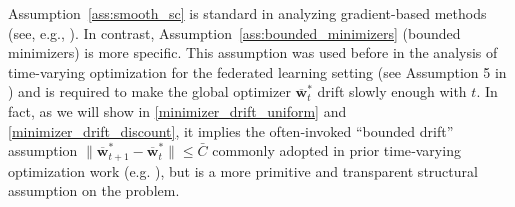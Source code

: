 \documentclass[conference]{IEEEtran}
\newcommand{\egl}[1]{{\color{blue}\bf{[EGL: #1]}}}
\newcommand{\fraz}[1]{\textcolor{purple}{\bf [Fraz: #1]}}
\newcommand{\nm}[1]{\textcolor{magenta}{\bf [NM: #1]}}
\begin{document}
Assumption~\ref{ass:smooth_sc} is standard in analyzing gradient-based methods (see, e.g., \cite{Nesterov,boyd2004convex}). 
In contrast, Assumption~\ref{ass:bounded_minimizers} (bounded minimizers) is more specific. This assumption 
was used before in the analysis of time-varying optimization for the federated learning setting (see Assumption 5 in \cite{hu2024energy}) and is required to make the global optimizer
$\overline{\mathbf{w}}^*_t$ drift slowly enough with $t$. In fact, as we will show in \eqref{minimizer_drift_uniform} and \eqref{minimizer_drift_discount}, it implies the often‐invoked “bounded drift” assumption  $\|\overline{\mathbf{w}}^*_{t+1}-\overline{\mathbf{w}}^*_t\|\le \bar{C}$
commonly adopted in prior time‐varying optimization work (e.g. \cite{Time_Structured}),
but is a more primitive and transparent structural assumption on the problem. 
\end{document}
